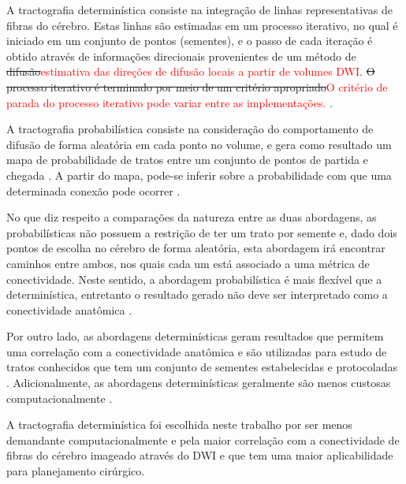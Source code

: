 \documentclass[
    12pt,                %
    oneside,            %
    a4paper,            %
    english,            %
    french,                %
    spanish,            %
    brazil                %
    ]{abntex2}
\begin{document}
A tractografia determinística consiste na integração de linhas representativas de fibras do cérebro. Estas linhas são estimadas em um processo iterativo, no qual é iniciado em um conjunto de pontos (sementes), e o passo de cada iteração é obtido através de informações direcionais provenientes de um método de \sout{difusão}\textcolor{red}{estimativa das direções de difusão locais a partir de volumes DWI}. \sout{O processo iterativo é terminado por meio de um critério apropriado}\textcolor{red}{O critério de parada do processo iterativo pode variar entre as implementações.} \cite{tournier2011}.



A tractografia probabilística consiste na consideração do comportamento de difusão de forma aleatória em cada ponto no volume, e gera como resultado um mapa de probabilidade de tratos entre um conjunto de pontos de partida e chegada \cite{DTI_Handbook}. A partir do mapa, pode-se inferir sobre a probabilidade com que uma determinada conexão pode ocorrer \cite{tournier2011}. %

No que diz respeito a comparações da natureza entre as duas abordagens, as probabilísticas não possuem a restrição de ter um trato por semente e, dado dois pontos de escolha no cérebro de forma aleatória, esta abordagem irá encontrar caminhos entre ambos, nos quais cada um está associado a uma métrica de conectividade. Neste sentido, a abordagem probabilística é mais flexível que a determinística, entretanto o resultado gerado não deve ser interpretado como a conectividade anatômica \cite{tournier2011}. 

Por outro lado, as abordagens determinísticas geram resultados que permitem uma correlação com a conectividade anatômica e são utilizadas para estudo de tratos conhecidos que tem um conjunto de sementes estabelecidas e protocoladas \cite{tournier2011}. Adicionalmente, as abordagens determinísticas geralmente são menos custosas computacionalmente \cite{DTI_Handbook}.

A tractografia determinística foi escolhida neste trabalho por ser menos demandante computacionalmente e pela maior correlação com a conectividade de fibras do cérebro imageado através do DWI e que tem uma maior aplicabilidade para planejamento cirúrgico.
\end{document}
